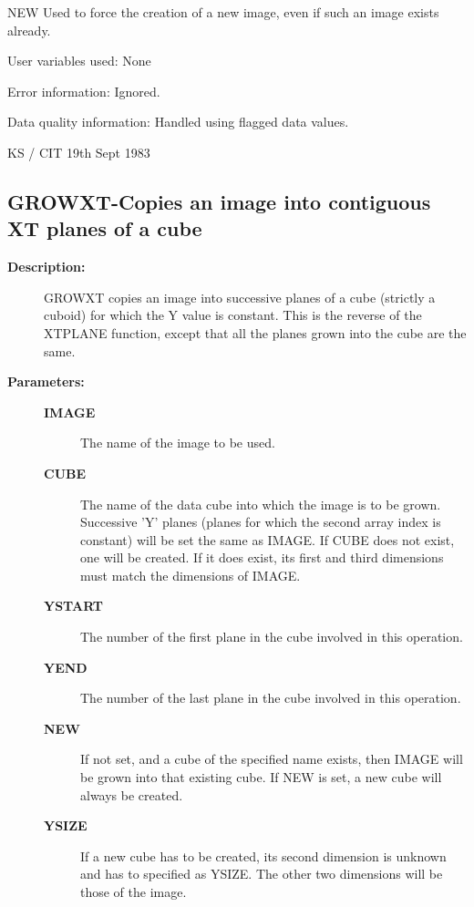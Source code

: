 \begin{description}
\begin{description}
\begin{terminalv}
 NEW         Used to force the creation of a new image, even if
             such an image exists already.

 User variables used:  None

 Error information:  Ignored.

 Data quality information: Handled using flagged data values.

                                         KS / CIT 19th Sept 1983
\end{terminalv}
\end{description}
\subsection{GROWXT-\label{GROWXT}Copies an image into contiguous XT planes of a cube}
\begin{description}

\item [\textbf{Description:}]
 GROWXT copies an image into successive planes of a cube (strictly
 a cuboid) for which the Y value is constant.  This is the reverse
 of the XTPLANE function, except that all the planes grown into the
 cube are the same.

\item [\textbf{Parameters:}]
\begin{description}
\item [\textbf{IMAGE}]
 The name of the image to be used.
\item [\textbf{CUBE}]
 The name of the data cube into which the image
 is to be grown.  Successive 'Y' planes (planes for which
 the second array index is constant) will be set the same
 as IMAGE.  If CUBE does not exist, one will be created.
 If it does exist, its first and third dimensions must
 match the dimensions of IMAGE.
\item [\textbf{YSTART}]
 The number of the first plane in the cube
 involved in this operation.
\item [\textbf{YEND}]
 The number of the last plane in the cube
 involved in this operation.
\item [\textbf{NEW}]
 If not set, and a cube of the specified name exists,
 then IMAGE will be grown into that existing cube.
 If NEW is set, a new cube will always be created.
\item [\textbf{YSIZE}]
 If a new cube has to be created, its second dimension
 is unknown and has to specified as YSIZE.  The other
 two dimensions will be those of the image.
\end{description}


\end{description}
\end{description}
